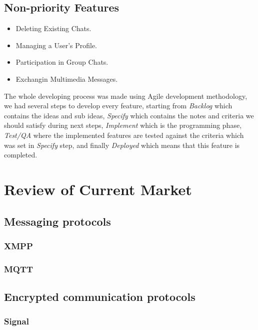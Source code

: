 \documentclass[11pt,a4paper]{report}
\begin{document}
\section{Non-priority Features}
	\begin{itemize}
		\item Deleting Existing Chats.
		\item Managing a User's Profile.
		\item Participation in Group Chats.
		\item Exchangin Multimedia Messages.
	\end{itemize}

The whole developing process was made using Agile development methodology, we had several steps to develop every feature, starting from \emph{Backlog} which contains the ideas and sub ideas, \emph {Specify} which contains the notes and criteria we should satisfy during next steps, \emph{Implement} which is the programming phase, \emph{Test/QA} where the implemented features are tested against the criteria which was set in \emph{Specify} step, and finally \emph{Deployed} which means that this feature is completed.



\chapter{Review of Current Market}


\section{Messaging protocols}

\subsection{XMPP}

\subsection{MQTT}

\section{Encrypted communication protocols}

\subsection{Signal}
\end{document}

